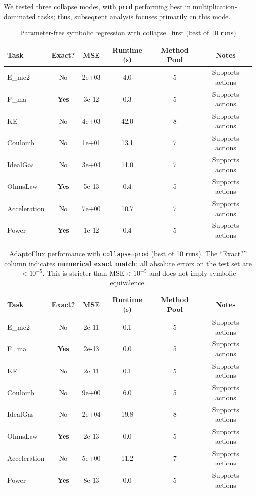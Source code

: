 We tested three collapse modes, with \texttt{prod} performing best in multiplication-dominated tasks; thus, subsequent analysis focuses primarily on this mode.

\begin{table}[htbp]
\centering
\caption{Parameter-free symbolic regression with collapse=first (best of 10 runs)}
\label{tab:baselines_first}
\begin{tabular}{lccccc}
\toprule
Task & Exact? & MSE & Runtime (s) & Method Pool & Notes \\
\midrule
E\_mc2 & No & 2e+03 & 4.0 & 5 & Supports actions \\
F\_ma & \textbf{Yes} & 3e-12 & 0.3 & 5 & Supports actions \\
KE & No & 4e+03 & 42.0 & 8 & Supports actions \\
Coulomb & No & 1e+01 & 13.1 & 7 & Supports actions \\
IdealGas & No & 3e+04 & 11.0 & 7 & Supports actions \\
OhmsLaw & \textbf{Yes} & 5e-13 & 0.4 & 5 & Supports actions \\
Acceleration & No & 7e+00 & 10.7 & 7 & Supports actions \\
Power & \textbf{Yes} & 1e-12 & 0.4 & 5 & Supports actions \\
\bottomrule
\end{tabular}
\end{table}

\begin{table}[htbp]
\centering
\caption{AdaptoFlux performance with \texttt{collapse=prod} (best of 10 runs). 
The ``Exact?'' column indicates \textbf{numerical exact match}: all absolute errors on the test set are $< 10^{-5}$. 
This is stricter than $\mathrm{MSE} < 10^{-5}$ and does not imply symbolic equivalence.}
\label{tab:baselines_prod}
\begin{tabular}{lccccc}
\toprule
Task & Exact? & MSE & Runtime (s) & Method Pool & Notes \\
\midrule
E\_mc2 & No & 2e-11 & 0.1 & 5 & Supports actions \\
F\_ma & \textbf{Yes} & 2e-13 & 0.0 & 5 & Supports actions \\
KE & No & 2e-11 & 0.1 & 5 & Supports actions \\
Coulomb & No & 9e+00 & 6.0 & 5 & Supports actions \\
IdealGas & No & 2e+04 & 19.8 & 8 & Supports actions \\
OhmsLaw & \textbf{Yes} & 2e-13 & 0.0 & 5 & Supports actions \\
Acceleration & No & 5e+00 & 11.2 & 7 & Supports actions \\
Power & \textbf{Yes} & 8e-13 & 0.0 & 5 & Supports actions \\
\bottomrule
\end{tabular}
\end{table}

